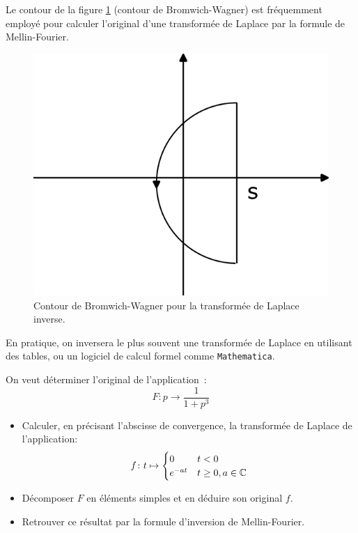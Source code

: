 Le contour de la figure \ref{fig:contour_laplace} (contour de Bromwich-Wagner) est fréquemment employé pour calculer l'original d'une transformée de Laplace par la formule de Mellin-Fourier.
\begin{figure}
    \centering
    \includegraphics[scale=0.8]{images/contour_laplace.png}
    \caption{Contour de Bromwich-Wagner pour la transformée de Laplace inverse.}
    \label{fig:contour_laplace}
\end{figure}
En pratique, on inversera le plus souvent une transformée de Laplace en utilisant des tables, ou un logiciel de calcul formel comme \texttt{Mathematica}.

\begin{exercice}
On veut déterminer l'original de l'application~:
\[
F : p \to \frac{1}{1+p^3}
\]
\begin{itemize}
\item Calculer, en précisant l'abscisse de convergence, la transformée de Laplace de l'application:
\[
f \colon t \mapsto \begin{cases}
    0 & t< 0 \\
    e^{-at} & t \geq 0, a \in \mathbb{C}
\end{cases}
\]
\item Décomposer $F$ en éléments simples et en déduire son original $f.$
\item Retrouver ce résultat par la formule d'inversion de Mellin-Fourier.
\end{itemize}
\end{exercice}

